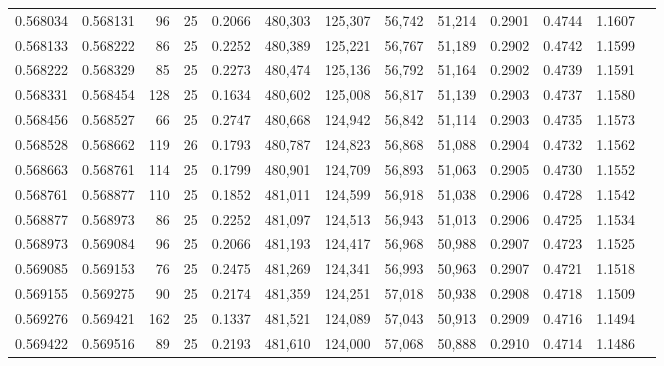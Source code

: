 \begin{tabular}{rrrrrrrrrrrrr}
0.568034 & 0.568131 &    96 &  25 &                                     0.2066 & 480,303 & 125,307 &  56,742 &  51,214 & 0.2901 & 0.4744 & 1.1607 \\
0.568133 & 0.568222 &    86 &  25 &                                     0.2252 & 480,389 & 125,221 &  56,767 &  51,189 & 0.2902 & 0.4742 & 1.1599 \\
0.568222 & 0.568329 &    85 &  25 &                                     0.2273 & 480,474 & 125,136 &  56,792 &  51,164 & 0.2902 & 0.4739 & 1.1591 \\
0.568331 & 0.568454 &   128 &  25 &                                     0.1634 & 480,602 & 125,008 &  56,817 &  51,139 & 0.2903 & 0.4737 & 1.1580 \\
0.568456 & 0.568527 &    66 &  25 &                                     0.2747 & 480,668 & 124,942 &  56,842 &  51,114 & 0.2903 & 0.4735 & 1.1573 \\
0.568528 & 0.568662 &   119 &  26 &                                     0.1793 & 480,787 & 124,823 &  56,868 &  51,088 & 0.2904 & 0.4732 & 1.1562 \\
0.568663 & 0.568761 &   114 &  25 &                                     0.1799 & 480,901 & 124,709 &  56,893 &  51,063 & 0.2905 & 0.4730 & 1.1552 \\
0.568761 & 0.568877 &   110 &  25 &                                     0.1852 & 481,011 & 124,599 &  56,918 &  51,038 & 0.2906 & 0.4728 & 1.1542 \\
0.568877 & 0.568973 &    86 &  25 &                                     0.2252 & 481,097 & 124,513 &  56,943 &  51,013 & 0.2906 & 0.4725 & 1.1534 \\
0.568973 & 0.569084 &    96 &  25 &                                     0.2066 & 481,193 & 124,417 &  56,968 &  50,988 & 0.2907 & 0.4723 & 1.1525 \\
0.569085 & 0.569153 &    76 &  25 &                                     0.2475 & 481,269 & 124,341 &  56,993 &  50,963 & 0.2907 & 0.4721 & 1.1518 \\
0.569155 & 0.569275 &    90 &  25 &                                     0.2174 & 481,359 & 124,251 &  57,018 &  50,938 & 0.2908 & 0.4718 & 1.1509 \\
0.569276 & 0.569421 &   162 &  25 &                                     0.1337 & 481,521 & 124,089 &  57,043 &  50,913 & 0.2909 & 0.4716 & 1.1494 \\
0.569422 & 0.569516 &    89 &  25 &                                     0.2193 & 481,610 & 124,000 &  57,068 &  50,888 & 0.2910 & 0.4714 & 1.1486 \\

\end{tabular}
